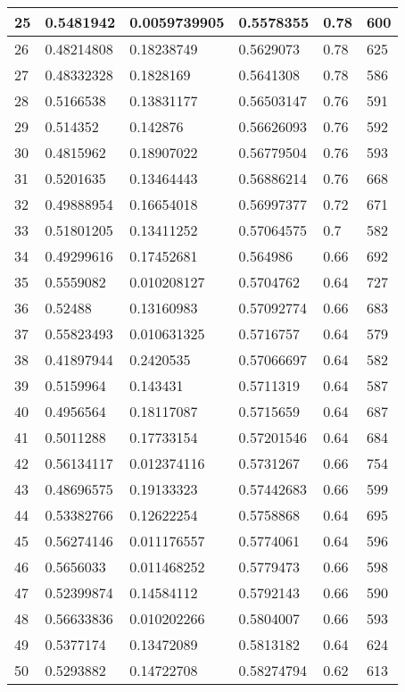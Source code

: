 \begin{longtable}{|l|l|l|l|l|l|}
25 & 0.5481942 & 0.0059739905 & 0.5578355 & 0.78 & 600 \\ \hline 
26 & 0.48214808 & 0.18238749 & 0.5629073 & 0.78 & 625 \\ \hline 
27 & 0.48332328 & 0.1828169 & 0.5641308 & 0.78 & 586 \\ \hline 
28 & 0.5166538 & 0.13831177 & 0.56503147 & 0.76 & 591 \\ \hline 
29 & 0.514352 & 0.142876 & 0.56626093 & 0.76 & 592 \\ \hline 
30 & 0.4815962 & 0.18907022 & 0.56779504 & 0.76 & 593 \\ \hline 
31 & 0.5201635 & 0.13464443 & 0.56886214 & 0.76 & 668 \\ \hline 
32 & 0.49888954 & 0.16654018 & 0.56997377 & 0.72 & 671 \\ \hline 
33 & 0.51801205 & 0.13411252 & 0.57064575 & 0.7 & 582 \\ \hline 
34 & 0.49299616 & 0.17452681 & 0.564986 & 0.66 & 692 \\ \hline 
35 & 0.5559082 & 0.010208127 & 0.5704762 & 0.64 & 727 \\ \hline 
36 & 0.52488 & 0.13160983 & 0.57092774 & 0.66 & 683 \\ \hline 
37 & 0.55823493 & 0.010631325 & 0.5716757 & 0.64 & 579 \\ \hline 
38 & 0.41897944 & 0.2420535 & 0.57066697 & 0.64 & 582 \\ \hline 
39 & 0.5159964 & 0.143431 & 0.5711319 & 0.64 & 587 \\ \hline 
40 & 0.4956564 & 0.18117087 & 0.5715659 & 0.64 & 687 \\ \hline 
41 & 0.5011288 & 0.17733154 & 0.57201546 & 0.64 & 684 \\ \hline 
42 & 0.56134117 & 0.012374116 & 0.5731267 & 0.66 & 754 \\ \hline 
43 & 0.48696575 & 0.19133323 & 0.57442683 & 0.66 & 599 \\ \hline 
44 & 0.53382766 & 0.12622254 & 0.5758868 & 0.64 & 695 \\ \hline 
45 & 0.56274146 & 0.011176557 & 0.5774061 & 0.64 & 596 \\ \hline 
46 & 0.5656033 & 0.011468252 & 0.5779473 & 0.66 & 598 \\ \hline 
47 & 0.52399874 & 0.14584112 & 0.5792143 & 0.66 & 590 \\ \hline 
48 & 0.56633836 & 0.010202266 & 0.5804007 & 0.66 & 593 \\ \hline 
49 & 0.5377174 & 0.13472089 & 0.5813182 & 0.64 & 624 \\ \hline 
50 & 0.5293882 & 0.14722708 & 0.58274794 & 0.62 & 613 \\ \hline 
\end{longtable}